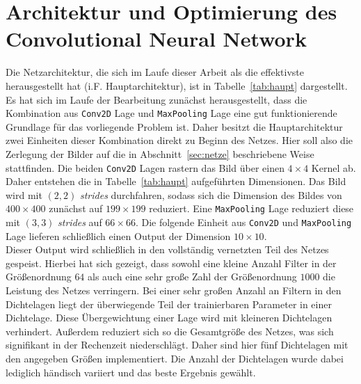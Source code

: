 \chapter{Architektur und Optimierung des Convolutional Neural Network}

Die Netzarchitektur, die sich im Laufe dieser Arbeit als die effektivste
herausgestellt hat (i.F. Hauptarchitektur), ist in Tabelle~\ref{tab:haupt} dargestellt. Es hat
sich im Laufe der Bearbeitung zunächst herausgestellt, dass die Kombination
aus \texttt{Conv2D} Lage und \texttt{MaxPooling} Lage eine gut
funktionierende Grundlage für das vorliegende Problem ist.
Daher besitzt die Hauptarchitektur zwei Einheiten dieser Kombination
direkt zu Beginn des Netzes. Hier soll also die Zerlegung der Bilder auf
die in Abschnitt~\ref{sec:netze} beschriebene Weise stattfinden.
Die beiden \texttt{Conv2D} Lagen rastern das Bild über einen $4\times4$
Kernel ab. Daher entstehen die in Tabelle~\ref{tab:haupt} aufgeführten
Dimensionen. Das Bild wird mit $(2, 2)$ \textit{strides} durchfahren,
sodass sich die Dimension des Bildes von $400\times400$ zunächst auf
$199\times199$ reduziert. Eine \texttt{MaxPooling} Lage reduziert diese
mit $(3, 3)$ \textit{strides} auf $66\times66$. Die folgende Einheit
aus  \texttt{Conv2D} und \texttt{MaxPooling} Lage lieferen schließlich
einen Output der Dimension $10\times10$.\\
Dieser Output wird schließlich in den vollständig vernetzten Teil des
Netzes gespeist. Hierbei hat sich gezeigt, dass sowohl eine kleine Anzahl
Filter in der Größenordnung $64$ als auch eine sehr große Zahl der
Größenordnung $1000$ die Leistung des Netzes verringern. Bei einer sehr großen
Anzahl an Filtern in den Dichtelagen liegt der überwiegende Teil der
trainierbaren Parameter in einer Dichtelage. Diese Übergewichtung einer Lage
wird mit kleineren Dichtelagen verhindert. Außerdem reduziert sich so die
Gesamtgröße des Netzes, was sich signifikant in der Rechenzeit niederschlägt.
Daher sind hier fünf Dichtelagen mit den angegeben Größen implementiert.
Die Anzahl der Dichtelagen wurde dabei lediglich händisch variiert und das
beste Ergebnis gewählt.
%
